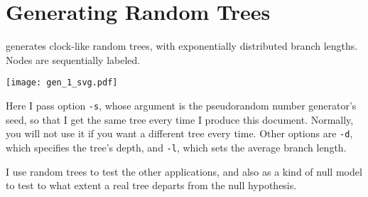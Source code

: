 \section{Generating Random Trees}
\label{sct_gen}

\gen{} generates clock-like random trees, with exponentially distributed branch
lengths. Nodes are sequentially labeled.


\begin{center}
\texttt{[image: gen\_1\_svg.pdf]}
\end{center}

\noindent{}Here I pass option \texttt{-s}, whose argument is the pseudorandom
number generator's seed, so that I get the same tree every time I produce this
document. Normally, you will not use it if you want a different tree every time.
Other options are \texttt{-d}, which specifies the tree's depth, and
\texttt{-l}, which sets the average branch length.

I use random trees to test the other applications, and also as a kind of null
model to test to what extent a real tree departs from the null hypothesis.
